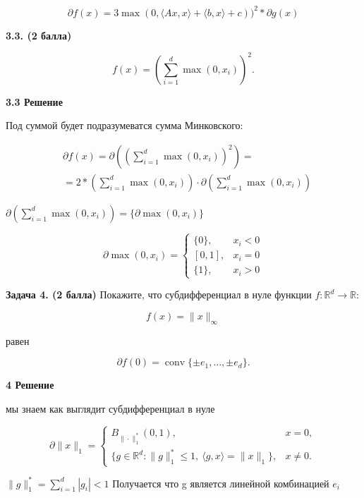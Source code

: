 \documentclass[12pt,a4paper]{article}
\begin{document}
$$
\partial f(x) = 3 \max (0, \langle Ax, x\rangle + \langle b, x\rangle + c))^2 * \partial g(x)
$$


\textbf{3.3. (2 балла)}

\[
f(x) = \left( \sum_{i=1}^d \max(0, x_i) \right)^2.
\]

\textbf{3.3 Решение}

Под суммой будет подразумеватся сумма Минковского:

$$
\begin{aligned}
  &\partial f(x) = \partial((\sum_{i=1}^d \max(0, x_i))^2) = \\
  &= 2 * (\sum_{i=1}^d \max(0, x_i)) \cdot \partial(\sum_{i=1}^d \max(0, x_i)) 
\end{aligned}
$$

$\partial(\sum_{i=1}^d \max(0, x_i)) = \{ \partial \max(0, x_i) \}$

$$
\partial \max(0, x_i)=
\begin{cases}
    \{0\}, & x_i < 0 \\
    [0, 1], & x_i = 0 \\
    \{1\}, & x_i > 0
\end{cases}
$$

\textbf{Задача 4. (2 балла)} Покажите, что субдифференциал в нуле функции $f: \mathbb{R}^d \to \mathbb{R}$:

\[
f(x) = \|x\|_\infty
\]

равен

\[
\partial f(0) = \operatorname{conv} \{ \pm e_1, \dots, \pm e_d \}.
\]


\textbf{4 Решение}

мы знаем как выглядит субдифференциал в нуле

$$
\partial \|x\|_1 = 
\begin{cases}
B_{\|\cdot\|_1^*}(0,1), & x = 0, \\
\{ g \in \mathbb{R}^d : \|g\|_1^* \leq 1,\ \langle g, x \rangle = \|x\|_1\}, & x \neq 0.
\end{cases}
$$

$\| g \|_1^*  = \sum_{i=1}^d |g_i| < 1$
Получается что g является линейной комбинацией $e_i$
\end{document}
